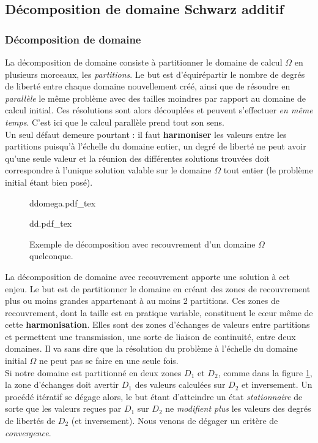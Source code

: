 \documentclass[a4paper,11pt]{article}
\newcommand{\incfig}[2]{%
	\def\svgwidth{#1\textwidth}
	\centering
	{#2.pdf_tex}
}
\begin{document}
\subsection{Décomposition de domaine Schwarz additif}
\subsubsection{Décomposition de domaine}
\noindent La décomposition de domaine consiste à partitionner le domaine de calcul $\Omega$ en plusieurs morceaux, les \textit{partitions}. Le but est d'équirépartir le nombre de degrés de liberté entre chaque domaine nouvellement créé, ainsi que de résoudre en \textit{parallèle} le même problème avec des tailles moindres par rapport au domaine de calcul initial. Ces résolutions sont alors découplées et peuvent s'effectuer \textit{en même temps}. C'est ici que le calcul parallèle prend tout son sens.\\

\noindent Un seul défaut demeure pourtant : il faut \textbf{harmoniser} les valeurs entre les partitions puisqu'à l'échelle du domaine entier, un degré de liberté ne peut avoir qu'une seule valeur et la réunion des différentes solutions trouvées doit correspondre à l'unique solution valable sur le domaine $\Omega$ tout entier (le problème initial étant bien posé).\\
\begin{figure}[H]
	\incfig{0.47}{ddomega}
	\incfig{0.47}{dd}
	\caption{Exemple de décomposition avec recouvrement d'un domaine $\Omega$ quelconque.}
	\label{fig:dd}
\end{figure}
\noindent La décomposition de domaine avec recouvrement apporte une solution à cet enjeu. Le but est de partitionner le domaine en créant des zones de recouvrement plus ou moins grandes appartenant à au moins 2 partitions. Ces zones de recouvrement, dont la taille est en pratique variable, constituent le c\oe ur même de cette \textbf{harmonisation}. Elles sont des zones d'échanges de valeurs entre partitions et permettent une transmission, une sorte de liaison de continuité, entre deux domaines. Il va sans dire que la résolution du problème à l'échelle du domaine initial $\Omega$ ne peut pas se faire en une seule fois.\\

\noindent Si notre domaine est partitionné en deux zones $D_1$ et $D_2$, comme dans la figure \ref{fig:dd}, la zone d'échanges doit avertir $D_1$ des valeurs calculées sur $D_2$ et inversement. Un procédé itératif se dégage alors, le but étant d'atteindre un état \textit{stationnaire} de sorte que les valeurs reçues par $D_1$ sur $D_2$ ne \textit{modifient plus} les valeurs des degrés de libertés de $D_2$ (et inversement). Nous venons de dégager un critère de \textit{convergence}.\\
\end{document}
